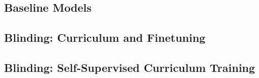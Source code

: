 %

\subsection{Baseline Models}

\subsection{Blinding: Curriculum and Finetuning}

\subsection{Blinding: Self-Supervised Curriculum Training}

